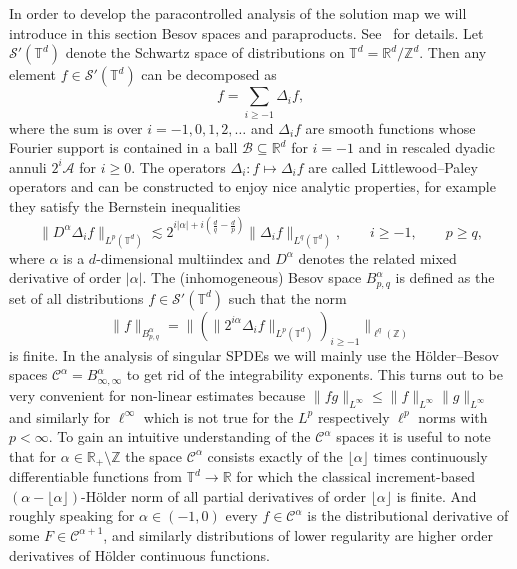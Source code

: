 \documentclass[a4paper, 11pt]{article}
\begin{document}
In order to develop the paracontrolled analysis of the solution map we will
introduce in this section Besov spaces and paraproducts.
See~{\cite{bahouri_fourier_2011}} for details. Let $\mathcal{S}'
(\mathbb{T}^d)$ denote the Schwartz space of distributions on $\mathbb{T}^d
=\mathbb{R}^d /\mathbb{Z}^d$. Then any element $f \in \mathcal{S}'
(\mathbb{T}^d)$ can be decomposed as
\[ f = \sum_{i \geqslant - 1} \Delta_i f, \]
where the sum is over $i = - 1, 0, 1, 2, \ldots$ and $\Delta_i f$ are smooth
functions whose Fourier support is contained in a ball $\mathcal{B} \subseteq
\mathbb{R}^d$ for $i = - 1$ and in rescaled dyadic annuli $2^i \mathcal{A}$
for $i \geqslant 0$. The operators $\Delta_i : f \mapsto \Delta_i f$ are
called Littlewood--Paley operators and can be constructed to enjoy nice
analytic properties, for example they satisfy the Bernstein inequalities
\[ \| D^{\alpha} \Delta_i f \|_{L^p (\mathbb{T}^d)} \lesssim 2^{i | \alpha |
   + i \left( \frac{d}{q} - \frac{d}{p} \right)} \| \Delta_i f \|_{L^q
   (\mathbb{T}^d)}, \qquad i \geqslant - 1, \qquad p \geqslant q, \]
where $\alpha$ is a $d$-dimensional multiindex and $D^{\alpha}$ denotes the
related mixed derivative of order $| \alpha |$. The (inhomogeneous) Besov
space $B^{\alpha}_{p, q}$ is defined as the set of all distributions $f \in
\mathcal{S}' (\mathbb{T}^d)$ such that the norm
\[ \| f \|_{B^{\alpha}_{p, q}} = \| (\| 2^{i \alpha} \Delta_i f \|_{L^p
   (\mathbb{T}^d)})_{i \geqslant - 1} \|_{\ell^q (\mathbb{Z})} \]
is finite. In the analysis of singular SPDEs we will mainly use the
H{\"o}lder--Besov spaces $\mathcal{C}^{\alpha} = B^{\alpha}_{\infty, \infty}$
to get rid of the integrability exponents. This turns out to be very
convenient for non-linear estimates because $\| f g \|_{L^{\infty}} \leqslant
\| f \|_{L^{\infty}} \| g \|_{L^{\infty}}$ and similarly for $\ell^{\infty}$
which is not true for the $L^p$ respectively $\ell^p$ norms with $p < \infty$.
To gain an intuitive understanding of the $\mathcal{C}^{\alpha}$ spaces it is
useful to note that for $\alpha \in \mathbb{R}_+ \setminus \mathbb{Z}$ the
space $\mathcal{C}^{\alpha}$ consists exactly of the $\lfloor \alpha \rfloor$
times continuously differentiable functions from $\mathbb{T}^d \rightarrow
\mathbb{R}$ for which the classical increment-based $(\alpha - \lfloor \alpha
\rfloor)$-H{\"o}lder norm of all partial derivatives of order $\lfloor \alpha
\rfloor$ is finite. And roughly speaking for $\alpha \in (- 1, 0)$ every $f
\in \mathcal{C}^{\alpha}$ is the distributional derivative of some $F \in
\mathcal{C}^{\alpha + 1}$, and similarly distributions of lower regularity are
higher order derivatives of H{\"o}lder continuous functions.
\end{document}
